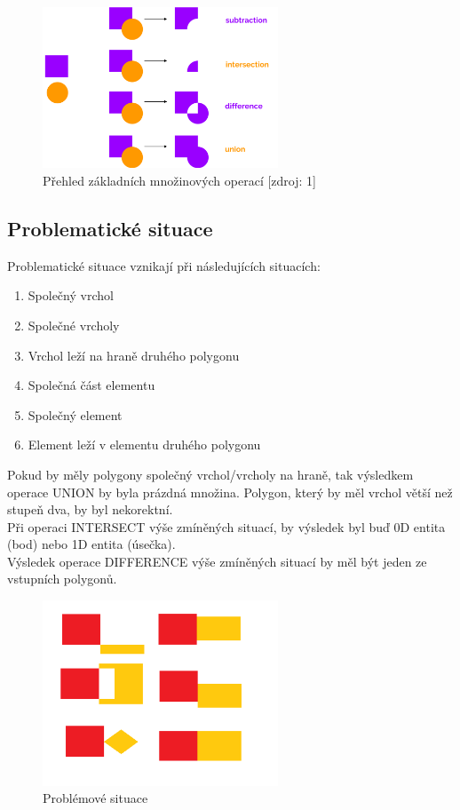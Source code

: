 \documentclass[a4paper, 12pt]{article}
\begin{document}
\begin{figure}[h!]
	\centering
	\includegraphics[width=7cm]{pictures/operace.png}
	\caption{Přehled základních množinových operací [zdroj: 1]}
\end{figure}

\subsection{Problematické situace}
Problematické situace vznikají při následujících situacích:

\begin{enumerate}
\item Společný vrchol
\item Společné vrcholy
\item Vrchol leží na hraně druhého polygonu
\item Společná část elementu
\item Společný element
\item Element leží v elementu druhého polygonu
\end{enumerate}

Pokud by měly polygony společný vrchol/vrcholy na hraně, tak výsledkem operace UNION by byla prázdná množina. Polygon, který by měl vrchol větší než stupeň dva, by byl nekorektní.\\

Při operaci INTERSECT výše zmíněných situací, by výsledek byl buď 0D entita (bod) nebo 1D entita (úsečka). \\

Výsledek operace DIFFERENCE výše zmíněných situací by měl být jeden ze vstupních polygonů.

\begin{figure}[h!]
	\centering
	\includegraphics[width=7cm]{pictures/problem.png}
	\caption{Problémové situace}
\end{figure}
\end{document}
